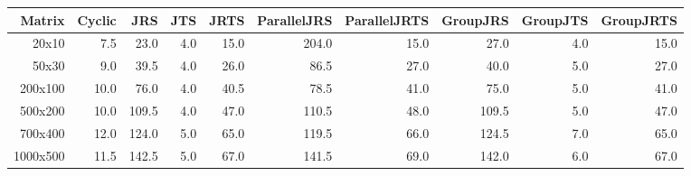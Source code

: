 \begin{tabular}{rrrrrrrrrr}
\toprule
Matrix & Cyclic & JRS & JTS & JRTS & ParallelJRS & ParallelJRTS & GroupJRS & GroupJTS & GroupJRTS \\
\midrule
20x10 & 7.5 & 23.0 & 4.0 & 15.0 & 204.0 & 15.0 & 27.0 & 4.0 & 15.0 \\
50x30 & 9.0 & 39.5 & 4.0 & 26.0 & 86.5 & 27.0 & 40.0 & 5.0 & 27.0 \\
200x100 & 10.0 & 76.0 & 4.0 & 40.5 & 78.5 & 41.0 & 75.0 & 5.0 & 41.0 \\
500x200 & 10.0 & 109.5 & 4.0 & 47.0 & 110.5 & 48.0 & 109.5 & 5.0 & 47.0 \\
700x400 & 12.0 & 124.0 & 5.0 & 65.0 & 119.5 & 66.0 & 124.5 & 7.0 & 65.0 \\
1000x500 & 11.5 & 142.5 & 5.0 & 67.0 & 141.5 & 69.0 & 142.0 & 6.0 & 67.0 \\
\bottomrule
\end{tabular}
